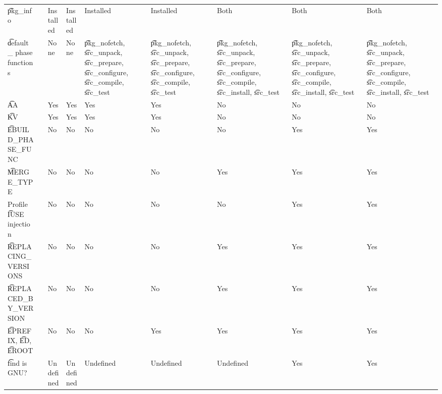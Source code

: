 \begin{landscape}
\begin{longtable}{llP{5em}P{5em}P{6em}P{6em}P{6em}P{6em}P{6em}}
\t{pkg\_info} &  &
    Installed & Installed & Installed & Installed & Both & Both & Both \\

\t{default\_} phase functions &  &
    None & None &
    \t{pkg\_nofetch}, \t{src\_unpack}, \t{src\_prepare}, \t{src\_configure}, \t{src\_compile}, \t{src\_test} &
    \t{pkg\_nofetch}, \t{src\_unpack}, \t{src\_prepare}, \t{src\_configure}, \t{src\_compile}, \t{src\_test} &
    \t{pkg\_nofetch}, \t{src\_unpack}, \t{src\_prepare}, \t{src\_configure},
        \t{src\_compile}, \t{src\_install}, \t{src\_test} &
    \t{pkg\_nofetch}, \t{src\_unpack}, \t{src\_prepare}, \t{src\_configure},
        \t{src\_compile}, \t{src\_install}, \t{src\_test} &
    \t{pkg\_nofetch}, \t{src\_unpack}, \t{src\_prepare}, \t{src\_configure},
        \t{src\_compile}, \t{src\_install}, \t{src\_test} \\

\t{AA} &  &
    Yes & Yes & Yes & Yes & No & No & No \\

\t{KV} &  &
    Yes & Yes & Yes & Yes & No & No & No \\

\t{EBUILD\_PHASE\_FUNC} &  &
    No & No & No & No & No & Yes & Yes \\

\t{MERGE\_TYPE} &  &
    No & No & No & No & Yes & Yes & Yes \\

Profile \t{IUSE} injection &  &
    No & No & No & No & No & Yes & Yes \\

\t{REPLACING\_VERSIONS} &  &
    No & No & No & No & Yes & Yes & Yes \\

\t{REPLACED\_BY\_VERSION} &  &
    No & No & No & No & Yes & Yes & Yes \\

\t{EPREFIX}, \t{ED}, \t{EROOT} &  &
    No & No & No & Yes & Yes & Yes & Yes \\

\t{find} is GNU? &  &
    Undefined & Undefined & Undefined & Undefined & Undefined & Yes & Yes \\


\end{longtable}
\end{landscape}
